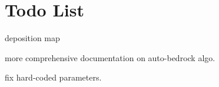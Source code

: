 \chapter{Todo List}
\hypertarget{todo}{}\label{todo}

\begin{DoxyRefList}
\item[Member \doxylink{namespacehmap_1_1gpu_a1c2651f7a65e696e8b444364abf0b3cc}{hmap\+::gpu\+::sediment\+\_\+deposition} (\doxylink{classhmap_1_1Array}{Array} \&z, \doxylink{classhmap_1_1Array}{Array} \texorpdfstring{$\ast$}{*}p\+\_\+mask, const \doxylink{classhmap_1_1Array}{Array} \&talus, \doxylink{classhmap_1_1Array}{Array} \texorpdfstring{$\ast$}{*}p\+\_\+deposition\+\_\+map=nullptr, float max\+\_\+deposition=0.\+01, int iterations=5, int thermal\+\_\+subiterations=10)]\label{todo__todo000001}%
%
deposition map 
\item[Member \doxylink{namespacehmap_1_1gpu_a36a2eba6d158e44d0ef917d9582987fe}{hmap\+::gpu\+::thermal\+\_\+auto\+\_\+bedrock} (\doxylink{classhmap_1_1Array}{Array} \&z, const \doxylink{classhmap_1_1Array}{Array} \&talus, int iterations=10, \doxylink{classhmap_1_1Array}{Array} \texorpdfstring{$\ast$}{*}p\+\_\+deposition\+\_\+map=nullptr)]\label{todo__todo000002}%
%
more comprehensive documentation on auto-\/bedrock algo. 



fix hard-\/coded parameters.
\end{DoxyRefList}